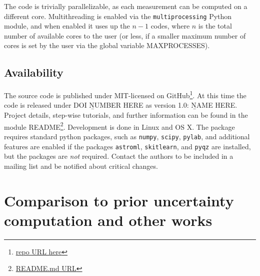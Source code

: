 \documentclass{emulateapj}
\begin{document}
 
The code is trivially parallelizable, as each measurement can be computed on a different core. Multithreading is enabled via the \verb=multiprocessing= Python module, and when enabled it uses up the $n-1$ codes, where $n$ is the total number of available cores to the user (or less, if a smaller maximum number of cores is set by the user via the global variable MAXPROCESSES).



\subsection{Availability}
The source code is published under MIT-licensed on GitHub\footnote{\url{repo URL here}}. At this time the code is released under DOI {\b NUMBER HERE} as version 1.0: {\b NAME HERE}. Project
details, step-wise tutorials, and further information can be found in the module README\footnote{\url{README.md URL}}.
Development is done in Linux and OS X. The package requires standard python packages, such as \verb=numpy=, \verb=scipy=, \verb=pylab=, and additional features are enabled if the packages \verb=astroml=, \verb=skitlearn=, and \verb=pyqz= are installed, but the packages are \emph{not} required. Contact the authors to be included in a mailing list and be notified about critical changes. 




\section{Comparison to prior uncertainty computation and other works }\label{comp_sec}
\end{document}
